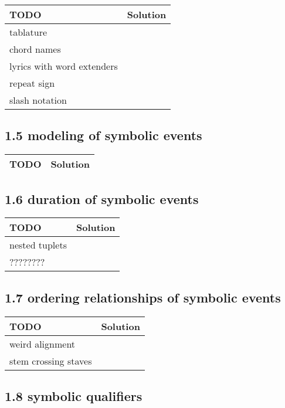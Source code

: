  \begin{tabular}{|p{}|p{}|}
 \hline
 \textbf{TODO} &
 \textbf{Solution} 
\\
 \hline
	tablature &
  
\\ 	\hline
	chord names &
  
\\ 	\hline
	lyrics with word extenders &
  
\\ 	\hline
	repeat sign &
  
\\ 	\hline
	slash notation &
  
\\ 	\hline
 \end{tabular} \subsection*{1.5 modeling of symbolic events}
 \begin{tabular}{|p{}|p{}|}
 \hline
 \textbf{TODO} &
 \textbf{Solution} 
\\
 \hline
 \end{tabular} \subsection*{1.6 duration of symbolic events}
 \begin{tabular}{|p{}|p{}|}
 \hline
 \textbf{TODO} &
 \textbf{Solution} 
\\
 \hline
	nested tuplets &
  
\\ 	\hline
	???????? &
  
\\ 	\hline
 \end{tabular} \subsection*{1.7 ordering relationships of symbolic events}
 \begin{tabular}{|p{}|p{}|}
 \hline
 \textbf{TODO} &
 \textbf{Solution} 
\\
 \hline
	weird alignment &
  
\\ 	\hline
	stem crossing staves &
  
\\ 	\hline
 \end{tabular} \subsection*{1.8 symbolic qualifiers}
